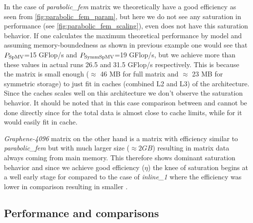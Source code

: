 In the case of \emph{parabolic\_fem} matrix we theoretically have a good efficiency as seen from \cref{fig:parabolic_fem_param}, but here we do not see any saturation in performance (see \cref{fig:parabolic_fem_scaling}), even \SpMV does not have this saturation behavior. If one calculates the maximum  theoretical performance by \roofline model and assuming memory-boundedness as shown in previous example one would see that $P_\mathrm{SpMV}$=15 GFlop/s and $P_\mathrm{SymmSpMV}$=19 GFlop/s, but we achieve more than these values in actual runs 26.5 and 31.5 GFlop/s respectively. This is because the matrix is small enough ($\approx$ 46 MB for full matrix and $\approx$ 23 MB for symmetric storage) to just fit in caches (combined L2 and L3) of the \SKX architecture. Since the caches scales well on this architecture we don't observe the saturation behavior. It should be noted that in this case comparison between \SpMV and \SymmSpmv cannot be done directly since for \SpMV the total data is almost close to cache limits, while for \SymmSpmv it would easily fit in cache.

\emph{Graphene-4096} matrix on the other hand is a matrix with efficiency similar to \emph{parabolic\_fem} but with much larger size ($\approx 2 GB$) resulting in matrix data always coming from main memory. This therefore shows dominant saturation behavior and since we achieve good efficiency ($\eta$) the knee of saturation begins at a well early stage for \SymmSpmv compared to  the case of \emph{inline\_1} where the efficiency was lower in comparison resulting in smaller \threadEff.

\subsection{Performance and comparisons}

